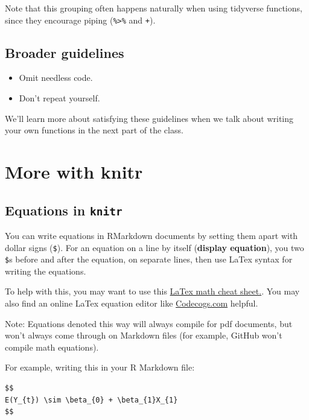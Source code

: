 \documentclass[]{book}
\providecommand{\tightlist}{%
  \setlength{\itemsep}{0pt}\setlength{\parskip}{0pt}}
\begin{document}
Note that this grouping often happens naturally when using tidyverse
functions, since they encourage piping (\texttt{\%\textgreater{}\%} and
\texttt{+}).

\subsection{Broader guidelines}\label{broader-guidelines}

\begin{itemize}
\tightlist
\item
  Omit needless code.
\item
  Don't repeat yourself.
\end{itemize}

We'll learn more about satisfying these guidelines when we talk about
writing your own functions in the next part of the class.

\section{More with knitr}\label{more-with-knitr}

\subsection{\texorpdfstring{Equations in
\texttt{knitr}}{Equations in knitr}}\label{equations-in-knitr}

You can write equations in RMarkdown documents by setting them apart
with dollar signs (\texttt{\$}). For an equation on a line by itself
(\textbf{display equation}), you two \texttt{\$}s before and after the
equation, on separate lines, then use LaTex syntax for writing the
equations.

To help with this, you may want to use this
\href{http://reu.dimacs.rutgers.edu/Symbols.pdf}{LaTex math cheat
sheet.}. You may also find an online LaTex equation editor like
\href{https://www.codecogs.com/latex/eqneditor.php}{Codecogs.com}
helpful.

Note: Equations denoted this way will always compile for pdf documents,
but won't always come through on Markdown files (for example, GitHub
won't compile math equations).

For example, writing this in your R Markdown file:

\begin{verbatim}
$$
E(Y_{t}) \sim \beta_{0} + \beta_{1}X_{1}
$$
\end{verbatim}
\end{document}
